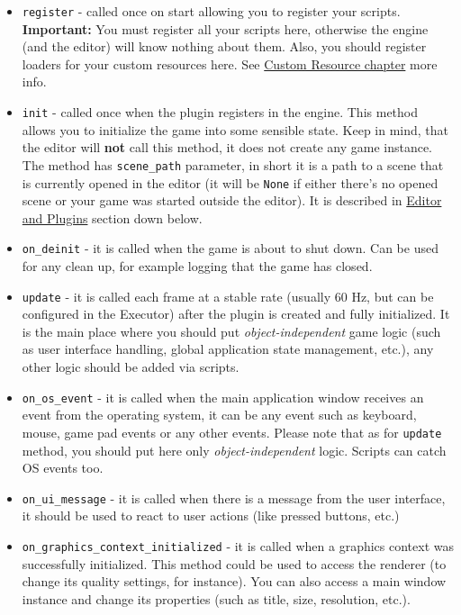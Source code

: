 \documentclass[
]{book}
\providecommand{\tightlist}{%
  \setlength{\itemsep}{0pt}\setlength{\parskip}{0pt}}
\theoremstyle{definition}
\theoremstyle{definition}
\theoremstyle{definition}
\theoremstyle{definition}
\theoremstyle{remark}
\begin{document}
\begin{itemize}
\tightlist
\item
  \texttt{register} - called once on start allowing you to register your scripts. \textbf{Important:} You must register all your scripts here, otherwise the engine (and the editor) will know nothing about them. Also, you should register loaders for your custom resources here. See \href{../resources/custom.md}{Custom Resource chapter} more info.
\item
  \texttt{init} - called once when the plugin registers in the engine. This method allows you to initialize the game into some sensible state. Keep in mind, that the editor will \textbf{not} call this method, it does not create any game instance. The method has \texttt{scene\_path} parameter, in short it is a path to a scene that is currently opened in the editor (it will be \texttt{None} if either there's no opened scene or your game was started outside the editor). It is described in \hyperref[editor-and-plugins]{Editor and Plugins} section down below.
\item
  \texttt{on\_deinit} - it is called when the game is about to shut down. Can be used for any clean up, for example logging that the game has closed.
\item
  \texttt{update} - it is called each frame at a stable rate (usually 60 Hz, but can be configured in the Executor) after the plugin is created and fully initialized. It is the main place where you should put \emph{object-independent} game logic (such as user interface handling, global application state management, etc.), any other logic should be added via scripts.
\item
  \texttt{on\_os\_event} - it is called when the main application window receives an event from the operating system, it can be any event such as keyboard, mouse, game pad events or any other events. Please note that as for \texttt{update} method, you should put here only \emph{object-independent} logic. Scripts can catch OS events too.
\item
  \texttt{on\_ui\_message} - it is called when there is a message from the user interface, it should be used to react to user actions (like pressed buttons, etc.)
\item
  \texttt{on\_graphics\_context\_initialized} - it is called when a graphics context was successfully initialized. This method could be used to access the renderer (to change its quality settings, for instance). You can also access a main window instance and change its properties (such as title, size, resolution, etc.).

\end{itemize}
\end{document}
